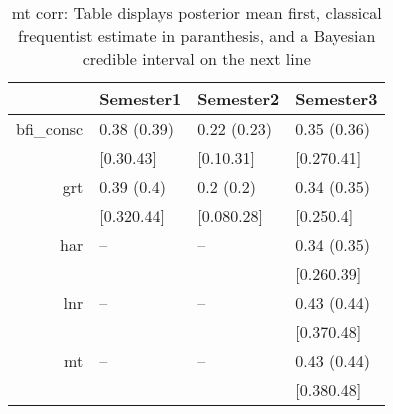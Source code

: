 \begin{table}[ht]
\centering
\begin{tabular}{rlll}
  \hline
 & Semester1 & Semester2 & Semester3 \\ 
  \hline
bfi\_consc & 0.38 (0.39) & 0.22 (0.23) & 0.35 (0.36) \\ 
   & [0.30.43] & [0.10.31] & [0.270.41] \\ 
  grt & 0.39 (0.4) & 0.2 (0.2) & 0.34 (0.35) \\ 
     & [0.320.44] & [0.080.28] & [0.250.4] \\ 
  har & -- & -- & 0.34 (0.35) \\ 
       &  &  & [0.260.39] \\ 
  lnr & -- & -- & 0.43 (0.44) \\ 
         &  &  & [0.370.48] \\ 
  mt & -- & -- & 0.43 (0.44) \\ 
           &  &  & [0.380.48] \\ 
   \hline
\end{tabular}
\caption{mt corr: Table displays posterior mean first, classical frequentist estimate in paranthesis, and a Bayesian credible interval on the next line} 
\label{mt_corr}
\end{table}
